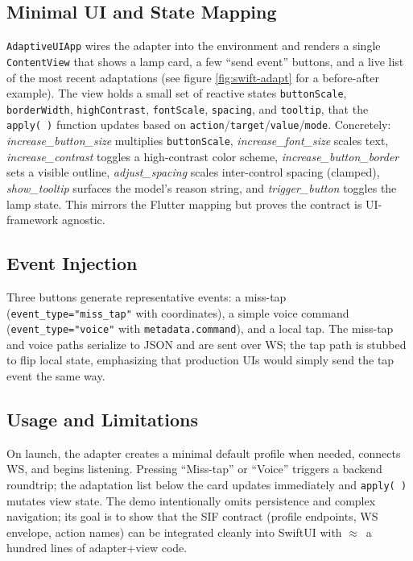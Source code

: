\subsection{Minimal UI and State Mapping}
\texttt{AdaptiveUIApp} wires the adapter into the environment and renders a single \texttt{ContentView} that shows a lamp card, a few “send event” buttons, and a live list of the most recent adaptations (see figure \ref{fig:swift-adapt} for a before-after example). The view holds a small set of reactive states \texttt{buttonScale}, \texttt{borderWidth}, \texttt{highContrast}, \texttt{fontScale}, \texttt{spacing}, and \texttt{tooltip}, that the \texttt{apply(\,)} function updates based on \texttt{action}/\texttt{target}/\texttt{value}/\texttt{mode}. Concretely:  
\emph{increase\_button\_size} multiplies \texttt{buttonScale}, \emph{increase\_font\_size} scales text, \emph{increase\_contrast} toggles a high-contrast color scheme, \emph{increase\_button\_border} sets a visible outline, \emph{adjust\_spacing} scales inter-control spacing (clamped), \emph{show\_tooltip} surfaces the model’s reason string, and \emph{trigger\_button} toggles the lamp state. This mirrors the Flutter mapping but proves the contract is UI-framework agnostic. 

\subsection{Event Injection}
Three buttons generate representative events: a miss-tap (\texttt{event\_type="miss\_tap"} with coordinates), a simple voice command (\texttt{event\_type="voice"} with \texttt{metadata.command}), and a local tap. The miss-tap and voice paths serialize to JSON and are sent over WS; the tap path is stubbed to flip local state, emphasizing that production UIs would simply send the tap event the same way. 

\subsection{Usage and Limitations}
On launch, the adapter creates a minimal default profile when needed, connects WS, and begins listening. Pressing “Miss-tap” or “Voice” triggers a backend roundtrip; the adaptation list below the card updates immediately and \texttt{apply(\,)} mutates view state. The demo intentionally omits persistence and complex navigation; its goal is to show that the SIF contract (profile endpoints, WS envelope, action names) can be integrated cleanly into SwiftUI with \(\approx\)~a hundred lines of adapter+view code.

